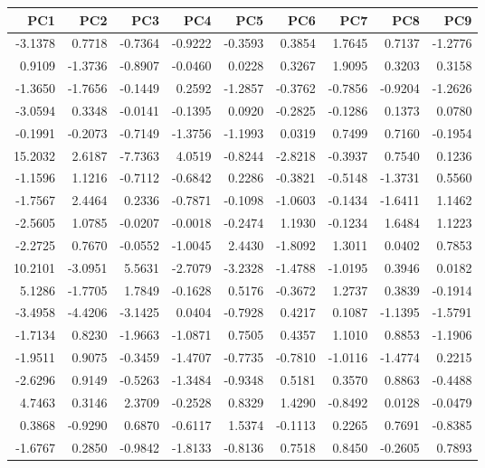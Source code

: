 \documentclass[
  letterpaper,
  DIV=11,
  numbers=noendperiod]{scrreprt}
\begin{document}
\begin{tabular}[t]{r|r|r|r|r|r|r|r|r}
\hline
PC1 & PC2 & PC3 & PC4 & PC5 & PC6 & PC7 & PC8 & PC9\\
\hline
-3.1378 & 0.7718 & -0.7364 & -0.9222 & -0.3593 & 0.3854 & 1.7645 & 0.7137 & -1.2776\\
\hline
0.9109 & -1.3736 & -0.8907 & -0.0460 & 0.0228 & 0.3267 & 1.9095 & 0.3203 & 0.3158\\
\hline
-1.3650 & -1.7656 & -0.1449 & 0.2592 & -1.2857 & -0.3762 & -0.7856 & -0.9204 & -1.2626\\
\hline
-3.0594 & 0.3348 & -0.0141 & -0.1395 & 0.0920 & -0.2825 & -0.1286 & 0.1373 & 0.0780\\
\hline
-0.1991 & -0.2073 & -0.7149 & -1.3756 & -1.1993 & 0.0319 & 0.7499 & 0.7160 & -0.1954\\
\hline
15.2032 & 2.6187 & -7.7363 & 4.0519 & -0.8244 & -2.8218 & -0.3937 & 0.7540 & 0.1236\\
\hline
-1.1596 & 1.1216 & -0.7112 & -0.6842 & 0.2286 & -0.3821 & -0.5148 & -1.3731 & 0.5560\\
\hline
-1.7567 & 2.4464 & 0.2336 & -0.7871 & -0.1098 & -1.0603 & -0.1434 & -1.6411 & 1.1462\\
\hline
-2.5605 & 1.0785 & -0.0207 & -0.0018 & -0.2474 & 1.1930 & -0.1234 & 1.6484 & 1.1223\\
\hline
-2.2725 & 0.7670 & -0.0552 & -1.0045 & 2.4430 & -1.8092 & 1.3011 & 0.0402 & 0.7853\\
\hline
10.2101 & -3.0951 & 5.5631 & -2.7079 & -3.2328 & -1.4788 & -1.0195 & 0.3946 & 0.0182\\
\hline
5.1286 & -1.7705 & 1.7849 & -0.1628 & 0.5176 & -0.3672 & 1.2737 & 0.3839 & -0.1914\\
\hline
-3.4958 & -4.4206 & -3.1425 & 0.0404 & -0.7928 & 0.4217 & 0.1087 & -1.1395 & -1.5791\\
\hline
-1.7134 & 0.8230 & -1.9663 & -1.0871 & 0.7505 & 0.4357 & 1.1010 & 0.8853 & -1.1906\\
\hline
-1.9511 & 0.9075 & -0.3459 & -1.4707 & -0.7735 & -0.7810 & -1.0116 & -1.4774 & 0.2215\\
\hline
-2.6296 & 0.9149 & -0.5263 & -1.3484 & -0.9348 & 0.5181 & 0.3570 & 0.8863 & -0.4488\\
\hline
4.7463 & 0.3146 & 2.3709 & -0.2528 & 0.8329 & 1.4290 & -0.8492 & 0.0128 & -0.0479\\
\hline
0.3868 & -0.9290 & 0.6870 & -0.6117 & 1.5374 & -0.1113 & 0.2265 & 0.7691 & -0.8385\\
\hline
-1.6767 & 0.2850 & -0.9842 & -1.8133 & -0.8136 & 0.7518 & 0.8450 & -0.2605 & 0.7893\\

\end{tabular}
\end{document}
